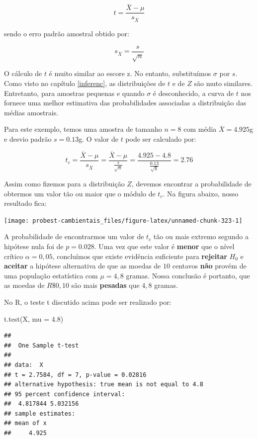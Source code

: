 \documentclass[
]{book}
\newenvironment{Shaded}{\begin{snugshade}}{\end{snugshade}}
\newcommand{\AttributeTok}[1]{\textcolor[rgb]{0.77,0.63,0.00}{#1}}
\newcommand{\FloatTok}[1]{\textcolor[rgb]{0.00,0.00,0.81}{#1}}
\newcommand{\FunctionTok}[1]{\textcolor[rgb]{0.00,0.00,0.00}{#1}}
\newcommand{\NormalTok}[1]{#1}
\begin{document}
\[t = \frac{\overline{X} - \mu}{s_{\overline{X}}}\]

sendo o erro padrão amostral obtido por:

\[s_{\overline{X}} = \frac{s}{\sqrt{n}}\]

O cálculo de \(t\) é muito similar ao escore z. No entanto, substituímos \(\sigma\) por \(s\). Como visto no capítulo \ref{inferenc}, as distribuições de \(t\) e de \(Z\) são muto similares. Entretanto, para amostras pequenas e quando \(\sigma\) é desconhecido, a curva de \(t\) nos fornece uma melhor estimativa das probabilidades associadas a distribuição das médias amostrais.

Para este exemplo, temos uma amostra de tamanho \(n = 8\) com média \(\overline{X} = 4.925\)g e desvio padrão \(s = 0.13\)g. O valor de \(t\) pode ser calculado por:

\[t_{c} = \frac{\overline{X} - \mu}{s_{\overline{X}}} = \frac{\overline{X} - \mu}{\frac{s}{\sqrt{n}}} = \frac{4.925  - 4.8}{\frac{0.13}{\sqrt{8}}} = 2.76\]

Assim como fizemos para a distribuição \(Z\), devemos encontrar a probabilidade de obtermos um valor tão ou maior que o módulo de \(t_c\). Na figura abaixo, nosso resultado fica:

\begin{center}\texttt{[image: probest-cambientais\_files/figure-latex/unnamed-chunk-323-1]} \end{center}

A probabilidade de encontrarmos um valor de \(t_c\) tão ou mais extremo segundo a hipótese nula foi de \(p = 0.028\). Uma vez que este valor é \textbf{menor} que o nível crítico \(\alpha = 0,05\), concluímos que existe evidência suficiente para \textbf{rejeitar} \(H_0\) e \textbf{aceitar} a hipótese alternativa de que as moedas de \(10\) centavos \textbf{não} provém de uma população estatística com \(\mu = 4,8\) gramas. Nossa conclusão é portanto, que as moedas de \(R\$ 0,10\) são mais \textbf{pesadas} que \(4,8\) gramas.

No R, o teste t discutido acima pode ser realizado por:

\begin{Shaded}
\begin{Highlighting}[]
\FunctionTok{t.test}\NormalTok{(X, }\AttributeTok{mu =} \FloatTok{4.8}\NormalTok{)}
\end{Highlighting}
\end{Shaded}

\begin{verbatim}
## 
##  One Sample t-test
## 
## data:  X
## t = 2.7584, df = 7, p-value = 0.02816
## alternative hypothesis: true mean is not equal to 4.8
## 95 percent confidence interval:
##  4.817844 5.032156
## sample estimates:
## mean of x 
##     4.925
\end{verbatim}
\end{document}
